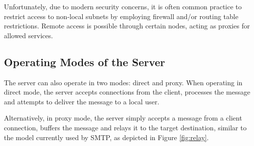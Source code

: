 Unfortunately, due to modern security concerns, it is often common 
practice to restrict access to non-local subnets by employing firewall
and/or routing table restrictions. Remote access is possible through
certain nodes, acting as proxies for allowed services. 


\subsection{Operating Modes of the Server}

The server can also operate in two modes: direct and proxy. When
operating in direct mode, the server accepts connections from the 
client, processes the message and attempts to deliver the message to a 
local user.


Alternatively, in proxy mode, the server simply accepts a message from a
client connection, buffers the message and relays it to the target 
destination, similar to the model currently used by SMTP, as depicted in
Figure \ref{fig:relay}.

\pagebreak



